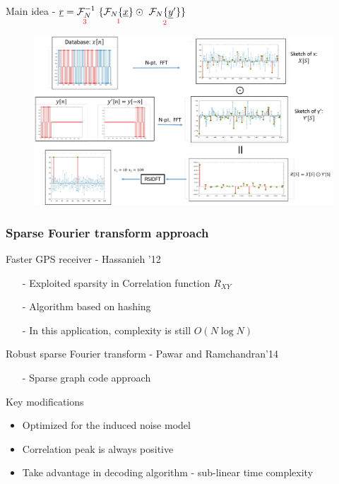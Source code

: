 \documentclass[10pt,xcolor=table]{beamer}
\newcommand{\xv}{\underline{x}}
\newcommand{\yv}{\underline{y}}
\newcommand{\rv}{\underline{r}}
\begin{document}
\begin{frame}{Main idea - $\rv = \underset{\text{\color{red} 3 } } {\mathcal{F}_{N}^{-1}} \ \{ \underset{\text{ \color{red} 1 } }{  \mathcal{F}_{N}\{\xv\}}  \odot \ \underset{\text{ \color{red} 2 } }{ \mathcal{F}_{N}\{\yv'\}}  \}$}

	\begin{figure}[t]
		\centering
		\includegraphics[width=4.8in]{Example_full_framework.pdf}
	\end{figure}
\end{frame}
\begin{frame}\frametitle{Sparse Fourier transform approach}

        \begin{block}{Faster GPS receiver - Hassanieh '12}
	 		\begin{itemize}
	 			\item[-] Exploited sparsity in Correlation function $R_{XY}$
                \item[-] Algorithm based on hashing
                \item[-] In this application, complexity is still $O(N \log N)$
	 		\end{itemize}		
	 	\end{block}	 	
\pause
        \begin{block}{Robust sparse Fourier transform - Pawar and Ramchandran'14}
	 		\begin{itemize}
	 			\item[-] Sparse graph code approach
	 		\end{itemize}
	 	\end{block}
\pause
\begin{block}{Key modifications}
   \begin{itemize}
   	\item Optimized for the induced noise model
   	\item Correlation peak is always {\color{blue} positive}
   	\item Take advantage in decoding algorithm - {\color{blue}sub-linear} time complexity
   \end{itemize}
\end{block}
\end{frame}
\end{document}
